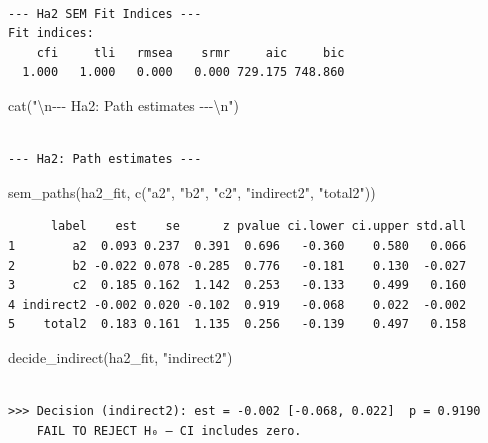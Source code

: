 \documentclass[
  letterpaper,
  DIV=11,
  numbers=noendperiod]{scrartcl}
\newenvironment{Shaded}{\begin{snugshade}}{\end{snugshade}}
\newcommand{\FunctionTok}[1]{\textcolor[rgb]{0.28,0.35,0.67}{#1}}
\newcommand{\NormalTok}[1]{\textcolor[rgb]{0.00,0.23,0.31}{#1}}
\newcommand{\SpecialCharTok}[1]{\textcolor[rgb]{0.37,0.37,0.37}{#1}}
\newcommand{\StringTok}[1]{\textcolor[rgb]{0.13,0.47,0.30}{#1}}
\begin{document}
\begin{verbatim}

--- Ha2 SEM Fit Indices ---
Fit indices:
    cfi     tli   rmsea    srmr     aic     bic 
  1.000   1.000   0.000   0.000 729.175 748.860 
\end{verbatim}

\begin{Shaded}
\begin{Highlighting}[]
\FunctionTok{cat}\NormalTok{(}\StringTok{"}\SpecialCharTok{\textbackslash{}n}\StringTok{{-}{-}{-} Ha2: Path estimates {-}{-}{-}}\SpecialCharTok{\textbackslash{}n}\StringTok{"}\NormalTok{)}
\end{Highlighting}
\end{Shaded}

\begin{verbatim}

--- Ha2: Path estimates ---
\end{verbatim}

\begin{Shaded}
\begin{Highlighting}[]
\FunctionTok{sem\_paths}\NormalTok{(ha2\_fit, }\FunctionTok{c}\NormalTok{(}\StringTok{"a2"}\NormalTok{, }\StringTok{"b2"}\NormalTok{, }\StringTok{"c2"}\NormalTok{, }\StringTok{"indirect2"}\NormalTok{, }\StringTok{"total2"}\NormalTok{))}
\end{Highlighting}
\end{Shaded}

\begin{verbatim}
      label    est    se      z pvalue ci.lower ci.upper std.all
1        a2  0.093 0.237  0.391  0.696   -0.360    0.580   0.066
2        b2 -0.022 0.078 -0.285  0.776   -0.181    0.130  -0.027
3        c2  0.185 0.162  1.142  0.253   -0.133    0.499   0.160
4 indirect2 -0.002 0.020 -0.102  0.919   -0.068    0.022  -0.002
5    total2  0.183 0.161  1.135  0.256   -0.139    0.497   0.158
\end{verbatim}

\begin{Shaded}
\begin{Highlighting}[]
\FunctionTok{decide\_indirect}\NormalTok{(ha2\_fit, }\StringTok{"indirect2"}\NormalTok{)}
\end{Highlighting}
\end{Shaded}

\begin{verbatim}

>>> Decision (indirect2): est = -0.002 [-0.068, 0.022]  p = 0.9190
    FAIL TO REJECT H₀ — CI includes zero.
\end{verbatim}
\end{document}
